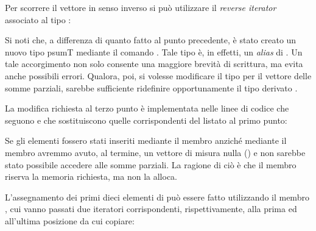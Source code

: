  Per scorrere il vettore in senso inverso si pu\`o utilizzare il
 \emph{reverse iterator} associato al tipo :
\lstset{basicstyle=\scriptsize\sf}

\lstset{basicstyle=\sf}

Si noti che, a differenza di quanto fatto al punto precedente, \`e
stato creato un nuovo tipo psumT mediante il comando
. Tale tipo \`e, in effetti, un \emph{alias} di
. Un tale accorgimento non solo consente una
maggiore brevit\`a di scrittura, ma evita anche possibili
errori. Qualora, poi, si volesse modificare il tipo per il vettore
delle somme parziali, sarebbe sufficiente ridefinire opportunamente il
tipo derivato . 

La modifica richiesta al terzo punto \`e implementata nelle linee di
codice che seguono e che sostituiscono quelle corrispondenti del
listato al primo punto:
\lstset{basicstyle=\scriptsize\sf}

\lstset{basicstyle=\sf}

Se gli elementi fossero stati inseriti mediante il membro
 anzich\'e mediante il membro  avremmo
avuto, al termine, un vettore di misura nulla ()
e non sarebbe stato possibile accedere alle somme parziali. La ragione
di ci\`o \`e che il membro  riserva la memoria
richiesta, ma non la alloca.

L'assegnamento dei primi dieci elementi di  pu\`o essere
fatto utilizzando il membro , cui vanno passati due
iteratori corrispondenti, rispettivamente, alla prima ed all'ultima
posizione da cui copiare:
\lstset{basicstyle=\scriptsize\sf}

\lstset{basicstyle=\sf}

